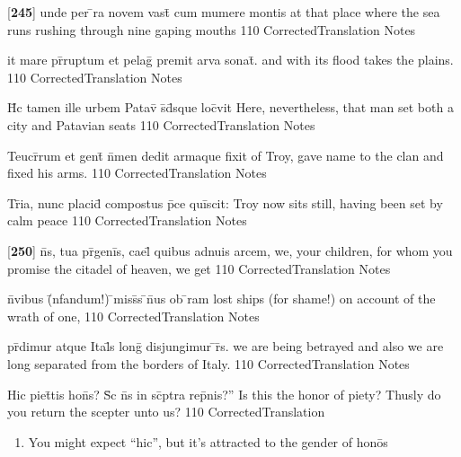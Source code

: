 \documentclass[]{book}
\begin{document}
\latline
  {[\textbf{245}] unde per \={}ra novem vast\={} cum mumere montis}
  { at that place where the sea runs rushing through nine gaping mouths }
  {110}
  { CorrectedTranslation }
  { Notes }


\latline
  {it mare pr\={}ruptum et pelag\={} premit arva sonat\={\macron {\i}}.}
  { and with its flood takes the plains. }
  {110}
  { CorrectedTranslation }
  { Notes }


\latline
  {H\={\macron {\i}}c tamen ille urbem Patav\={\macron {\i}} s\={}d\={}sque loc\={}vit}
  { Here, nevertheless, that man set both a city and Patavian seats }
  {110}
  { CorrectedTranslation }
  { Notes }


\latline
  {Teucr\={}rum et gent\={\macron {\i}} n\={}men dedit armaque fixit}
  { of Troy, gave name to the clan and fixed his arms. }
  {110}
  { CorrectedTranslation }
  { Notes }


\latline
  {Tr\={}ia, nunc placid\={} compostus p\={}ce qui\={}scit:}
  { Troy now sits still, having been set by calm peace  }
  {110}
  { CorrectedTranslation }
  { Notes }


\latline
  {[\textbf{250}] n\={}s, tua pr\={}geni\={}s, cael\={\macron {\i}} quibus adnuis arcem,}
  { we, your children, for whom you promise the citadel of heaven, we get  }
  {110}
  { CorrectedTranslation }
  { Notes }


\latline
  {n\={}vibus (\={\macron {\i}}nfandum!) \={}miss\={\macron {\i}}s \={}n\={\macron {\i}}us ob \={\macron {\i}}ram}
  { lost ships (for shame!) on account of the wrath of one,  }
  {110}
  { CorrectedTranslation }
  { Notes }


\latline
  {pr\={}dimur atque Ital\={\macron {\i}}s long\={} disjungimur \={}r\={\macron {\i}}s.}
  { we are being betrayed and also we are long separated from the borders of Italy. }
  {110}
  { CorrectedTranslation }
  { Notes }


\latline
  {Hic piet\={}tis hon\={}s?  S\={\macron {\i}}c n\={}s in sc\={}ptra rep\={}nis?''}
  { Is this the honor of piety?  Thusly do you return the scepter unto us? }
  {110}
  { CorrectedTranslation }
  { \begin{enumerate}
  	\item You might expect ``hic'', but it's attracted to the gender of hon\={o}s
  \end{enumerate} }
\end{document}
